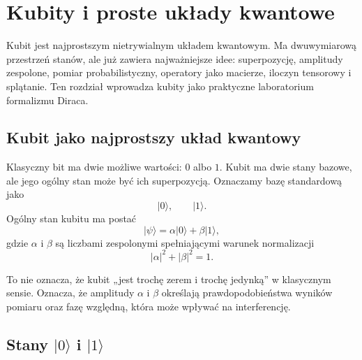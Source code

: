 \chapter{Kubity i proste układy kwantowe}

\begin{summarybox}
Kubit jest najprostszym nietrywialnym układem kwantowym. Ma dwuwymiarową
przestrzeń stanów, ale już zawiera najważniejsze idee: superpozycję, amplitudy
zespolone, pomiar probabilistyczny, operatory jako macierze, iloczyn tensorowy i
splątanie. Ten rozdział wprowadza kubity jako praktyczne laboratorium formalizmu
Diraca.
\end{summarybox}

\section{Kubit jako najprostszy układ kwantowy}

Klasyczny bit ma dwie możliwe wartości: \(0\) albo \(1\). Kubit ma dwie stany bazowe, ale jego ogólny stan może być ich superpozycją. Oznaczamy bazę standardową jako
\begin{equation}
    |0\rangle,
    \qquad
    |1\rangle.
\end{equation}
Ogólny stan kubitu ma postać
\begin{equation}
    |\psi\rangle=\alpha|0\rangle+\beta|1\rangle,
\end{equation}
gdzie \(\alpha\) i \(\beta\) są liczbami zespolonymi spełniającymi warunek normalizacji
\begin{equation}
    |\alpha|^2+|\beta|^2=1.
\end{equation}

To nie oznacza, że kubit „jest trochę zerem i trochę jedynką” w klasycznym sensie. Oznacza, że amplitudy \(\alpha\) i \(\beta\) określają prawdopodobieństwa wyników pomiaru oraz fazę względną, która może wpływać na interferencję.

\section{Stany \texorpdfstring{\(|0\rangle\)}{|0>} i \texorpdfstring{\(|1\rangle\)}{|1>}}

